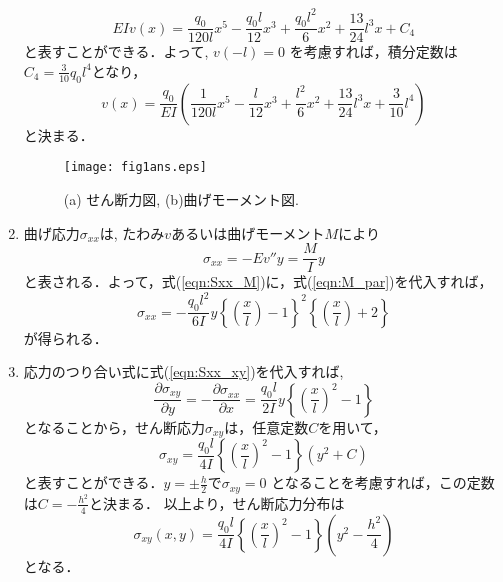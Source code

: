 \documentclass[10pt,a4j]{jarticle}
\begin{document}
\begin{enumerate}
\begin{equation}
	EIv(x) = 
	\frac{q_0}{120l}x^5-\frac{q_0l}{12}x^3 +\frac{q_0l^2}{6}x^2 +\frac{13}{24}l^3x +C_4
	\label{eqn:v_gen}
\end{equation}
と表すことができる．よって, $v\left(-l \right)=0$
を考慮すれば，積分定数は$C_4=\frac{3}{10}q_0l^4$となり，
\begin{equation}
	v(x) = 
	\frac{q_0}{EI}	
	\left(
		\frac{1}{120l}x^5-\frac{l}{12}x^3 +\frac{l^2}{6}x^2 
		+\frac{13}{24}l^3x+ \frac{3}{10}l^4
	\right)
	\label{eqn:v_par}
\end{equation}
と決まる．
\begin{figure}[h]
	\begin{center}
	\texttt{[image: fig1ans.eps]} 
	\end{center}
	\caption{(a) せん断力図, (b)曲げモーメント図.}
	\label{fig:fig1}
\end{figure}
\item
曲げ応力$\sigma_{xx}$は, たわみ$v$あるいは曲げモーメント$M$により
\begin{equation}
	\sigma_{xx}=-Ev''y= \frac{M}{I}y 
	\label{eqn:Sxx_M}
\end{equation}
と表される．よって，式(\ref{eqn:Sxx_M})に，式(\ref{eqn:M_par})を代入すれば，
\begin{equation}
	\sigma_{xx}=
	-\frac{q_0l^2}{6I}y
	\left\{
		\left(\frac{x}{l}\right)-1
	\right \}^2
	\left\{
		\left(\frac{x}{l}\right)+2
	\right \}
	\label{eqn:Sxx_xy}
\end{equation}
が得られる．
\item
応力のつり合い式に式(\ref{eqn:Sxx_xy})を代入すれば, 
\begin{equation}
	\frac{\partial \sigma_{xy}}{\partial y}
	=
	-\frac{\partial \sigma_{xx}}{\partial x}
	=
	\frac{q_0l}{2I}y\left\{ \left(\frac{x}{l}\right)^2-1\right\}
	\label{eqn:ODE}
\end{equation}
となることから，せん断応力$\sigma_{xy}$は，任意定数$C$を用いて，
\begin{equation}
	\sigma_{xy}=
	\frac{q_0l}{4I}\left\{ \left(\frac{x}{l}\right)^2-1\right\}\left( y^2 +C\right)
	\label{eqn:Sxy_gen}
\end{equation}
と表すことができる．$y=\pm \frac{h}{2}$で$\sigma_{xy}=0$
となることを考慮すれば，この定数は$C=-\frac{h^2}{4}$と決まる．
以上より，せん断応力分布は
\begin{equation}
	\sigma_{xy}(x,y) 
	= 
	\frac{q_0l}{4I}\left\{ \left(\frac{x}{l}\right)^2-1\right\}\left( y^2 -\frac{h^2}{4}\right)
\end{equation}
となる．
\end{enumerate}
\end{document}
